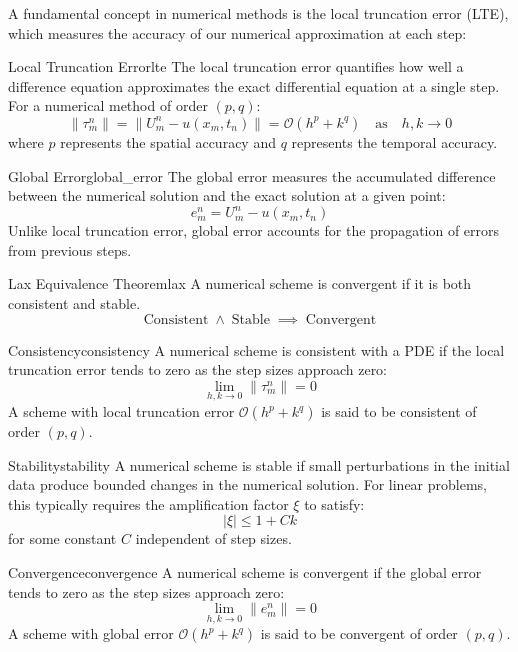 A fundamental concept in numerical methods is the local truncation error (LTE), which measures the accuracy of our numerical approximation at each step:

\begin{definition}{Local Truncation Error}{lte}
  The local truncation error quantifies how well a difference equation approximates the exact differential equation at a single step. For a numerical method of order $(p,q)$:
  \[
    \|\tau_m^n\| = \|U_m^n-u(x_m, t_n)\| = \mathcal{O}(h^p + k^q) \quad \text{as} \quad h, k \to 0
  \]
  where $p$ represents the spatial accuracy and $q$ represents the temporal accuracy.
\end{definition}

\begin{definition}{Global Error}{global_error}
  The global error measures the accumulated difference between the numerical solution and the exact solution at a given point:
  \[
    e_m^n = U_m^n - u(x_m, t_n)
  \]
  Unlike local truncation error, global error accounts for the propagation of errors from previous steps.
\end{definition}

\begin{theorem}{Lax Equivalence Theorem}{lax}
  A numerical scheme is convergent if it is both consistent and stable.
  \[
    \operatorname{Consistent} \land \operatorname{Stable} \implies \operatorname{Convergent}
  \]
\end{theorem}

\begin{definition}{Consistency}{consistency}
  A numerical scheme is consistent with a PDE if the local truncation error tends to zero as the step sizes approach zero:
  \[
    \lim_{h,k \to 0} \|\tau_m^n\| = 0
  \]
  A scheme with local truncation error $\mathcal{O}(h^p + k^q)$ is said to be consistent of order $(p,q)$.
\end{definition}

\begin{definition}{Stability}{stability}
  A numerical scheme is stable if small perturbations in the initial data produce bounded changes in the numerical solution. For linear problems, this typically requires the amplification factor $\xi$ to satisfy:
  \[
    |\xi| \leq 1 + Ck
  \]
  for some constant $C$ independent of step sizes.
\end{definition}

\begin{definition}{Convergence}{convergence}
  A numerical scheme is convergent if the global error tends to zero as the step sizes approach zero:
  \[
    \lim_{h,k \to 0} \|e_m^n\| = 0
  \]
  A scheme with global error $\mathcal{O}(h^p + k^q)$ is said to be convergent of order $(p,q)$.
\end{definition}

